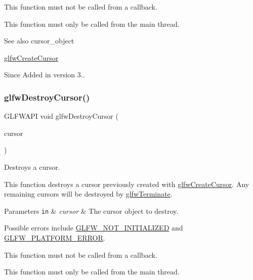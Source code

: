 This function must not be called from a callback.

This function must only be called from the main thread.

\begin{DoxySeeAlso}{See also}
cursor\+\_\+object 

\hyperlink{group__input_ga21fc9f020f062db88813aa722c30ba2c}{glfw\+Create\+Cursor}
\end{DoxySeeAlso}
\begin{DoxySince}{Since}
Added in version 3.. 
\end{DoxySince}
\mbox{\label{group__input_ga27556b7122117bc1bbb4bb3cc003ea43}} 
\subsubsection{\texorpdfstring{glfw\+Destroy\+Cursor()}{glfwDestroyCursor()}}
{\footnotesize\ttfamily G\+L\+F\+W\+A\+PI void glfw\+Destroy\+Cursor (\begin{DoxyParamCaption}\item[{G\+L\+F\+Wcursor $\ast$}]{cursor }\end{DoxyParamCaption})}



Destroys a cursor. 

This function destroys a cursor previously created with \hyperlink{group__input_ga21fc9f020f062db88813aa722c30ba2c}{glfw\+Create\+Cursor}. Any remaining cursors will be destroyed by \hyperlink{group__init_gafd90e6fd4819ea9e22e5e739519a6504}{glfw\+Terminate}.


\begin{DoxyParams}[1]{Parameters}
\mbox{\tt in}  & {\em cursor} & The cursor object to destroy.\\
\hline
\end{DoxyParams}
Possible errors include \hyperlink{group__errors_ga2374ee02c177f12e1fa76ff3ed15e14a}{G\+L\+F\+W\+\_\+\+N\+O\+T\+\_\+\+I\+N\+I\+T\+I\+A\+L\+I\+Z\+ED} and \hyperlink{group__errors_gad44162d78100ea5e87cdd38426b8c7a1}{G\+L\+F\+W\+\_\+\+P\+L\+A\+T\+F\+O\+R\+M\+\_\+\+E\+R\+R\+OR}.

This function must not be called from a callback.

This function must only be called from the main thread.

